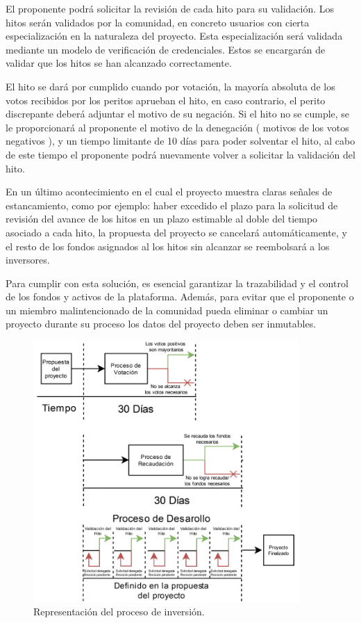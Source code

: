\bigskip

El proponente podrá solicitar la revisión de cada hito para su validación. Los hitos serán validados por la comunidad, en concreto usuarios  con cierta especialización en la naturaleza del proyecto. Esta especialización será validada mediante un modelo de verificación de credenciales\cite{w3c}. Estos se encargarán de validar que los hitos se han alcanzado correctamente. 

\bigskip

El hito se dará por cumplido cuando por votación, la mayoría absoluta de los votos recibidos por los peritos aprueban el hito, en caso contrario, el perito discrepante deberá adjuntar el motivo de su negación. Si el hito no se cumple, se le proporcionará al proponente el motivo de la denegación ( motivos de los votos negativos ), y un tiempo limitante de 10 días para poder solventar el hito, al cabo de este tiempo el proponente podrá nuevamente volver a solicitar la validación del hito.

\bigskip

En un último acontecimiento en el cual el proyecto muestra claras señales de estancamiento, como por ejemplo: haber excedido el plazo para la solicitud de revisión del avance de los hitos en un plazo estimable al doble del tiempo asociado a cada hito, la propuesta del proyecto se cancelará automáticamente, y el resto de los fondos asignados al los hitos sin alcanzar se reembolsará a los inversores.

\bigskip

Para cumplir con esta solución, es esencial garantizar la trazabilidad y el control de los fondos y activos de la plataforma. Además, para evitar que el proponente o un miembro malintencionado de la comunidad pueda eliminar o cambiar un proyecto durante su proceso los datos del proyecto deben ser inmutables.

\begin{figure}[H]
        \centering
        \includegraphics[width=0.9\textwidth]{img/diagramas/proceso_vertical.png}
        \caption{Representación del proceso de inversión.}
        \label{fig:configApi}
\end{figure}

